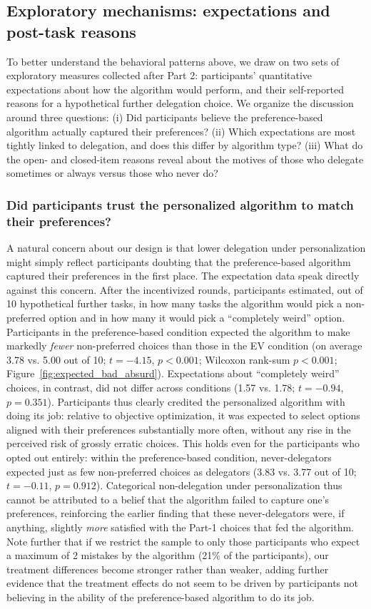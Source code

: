 \documentclass[a4paper, 12pt, fleqn]{article}
\theoremstyle{definition}
\begin{document}
\subsection{Exploratory mechanisms: expectations and post-task reasons}
\label{sec:exploratory_mechanisms}
To better understand the behavioral patterns above, we draw on two sets of exploratory measures collected after Part 2: participants' quantitative expectations about how the algorithm would perform, and their self-reported reasons for a hypothetical further delegation choice. We organize the discussion around three questions: (i) Did participants believe the preference-based algorithm actually captured their preferences? (ii) Which expectations are most tightly linked to delegation, and does this differ by algorithm type? (iii) What do the open- and closed-item reasons reveal about the motives of those who delegate sometimes or always versus those who never do?

\subsubsection*{Did participants trust the personalized algorithm to match their preferences?}
A natural concern about our design is that lower delegation under personalization might simply reflect participants doubting that the preference-based algorithm captured their preferences in the first place. The expectation data speak directly against this concern. After the incentivized rounds, participants estimated, out of 10 hypothetical further tasks, in how many tasks the algorithm would pick a non-preferred option and in how many it would pick a ``completely weird'' option. Participants in the preference-based condition expected the algorithm to make markedly \emph{fewer} non-preferred choices than those in the EV condition (on average 3.78 vs. 5.00 out of 10; $t = -4.15$, $p < 0.001$; Wilcoxon rank-sum $p < 0.001$; Figure~\ref{fig:expected_bad_absurd}). Expectations about ``completely weird'' choices, in contrast, did not differ across conditions (1.57 vs. 1.78; $t = -0.94$, $p = 0.351$). Participants thus clearly credited the personalized algorithm with doing its job: relative to objective optimization, it was expected to select options aligned with their preferences substantially more often, without any rise in the perceived risk of grossly erratic choices. This holds even for the participants who opted out entirely: within the preference-based condition, never-delegators expected just as few non-preferred choices as delegators (3.83 vs. 3.77 out of 10; $t = -0.11$, $p = 0.912$). Categorical non-delegation under personalization thus cannot be attributed to a belief that the algorithm failed to capture one's preferences, reinforcing the earlier finding that these never-delegators were, if anything, slightly \emph{more} satisfied with the Part-1 choices that fed the algorithm. Note further that if we restrict the sample to only those participants who expect a maximum of 2 mistakes by the algorithm (21\% of the participants), our treatment differences become stronger rather than weaker, adding further evidence that the treatment effects do not seem to be driven by participants not believing in the ability of the preference-based algorithm to do its job.
\end{document}
